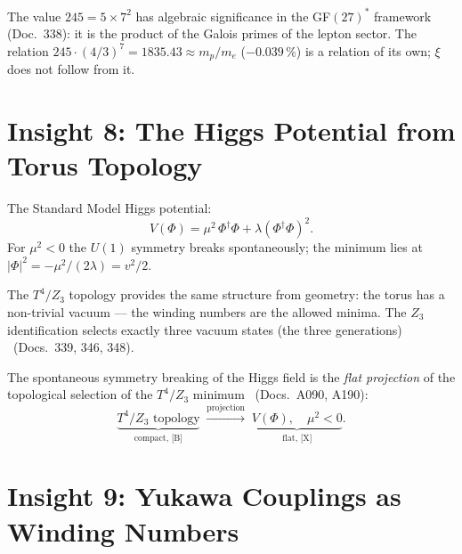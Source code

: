 The value $245 = 5 \times 7^2$ has algebraic significance in the GF$(27)^*$
framework (Doc.~338): it is the product of the Galois primes of the lepton
sector. The relation $245\cdot(4/3)^7 = 1835.43 \approx m_p/m_e$ ($-0.039\,\%$)
is a relation of its own; $\xi$ does not follow from it.

\section{Insight 8: The Higgs Potential from Torus Topology}

The Standard Model Higgs potential:
\begin{equation}
  V(\Phi) = \mu^2\,\Phi^\dagger\Phi + \lambda(\Phi^\dagger\Phi)^2.
  \label{eq:higgs_potential}
\end{equation}
For $\mu^2 < 0$ the $U(1)$ symmetry breaks spontaneously; the minimum lies
at $|\Phi|^2 = -\mu^2/(2\lambda) = v^2/2$.

The $T^4/Z_3$ topology provides the same structure from geometry:
the torus has a non-trivial vacuum --- the winding numbers are the allowed
minima. The $Z_3$ identification selects exactly three vacuum states
(the three generations) \BM\ (Docs.~339, 346, 348).

The spontaneous symmetry breaking of the Higgs field is the \emph{flat
projection} of the topological selection of the $T^4/Z_3$ minimum \BM\
(Docs.~A090, A190):
\begin{equation}
  \underbrace{T^4/Z_3\text{ topology}}_{\text{compact, [B]}}
  \;\xrightarrow{\text{projection}}\;
  \underbrace{V(\Phi),\quad\mu^2 < 0}_{\text{flat, [X]}}.
  \label{eq:projection}
\end{equation}

\section{Insight 9: Yukawa Couplings as Winding Numbers}

